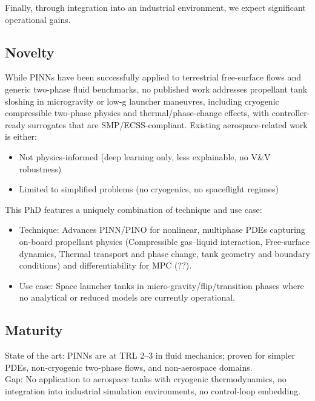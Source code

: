 \documentclass[12pt]{article}
\begin{document}
	Finally, through integration into an industrial environment, we expect significant operational gains.
	
	\subsection*{Novelty}
	
	While PINNs have been successfully applied to terrestrial free-surface flows and generic two-phase fluid benchmarks, no published work addresses propellant tank sloshing in microgravity or low-g launcher maneuvres, including cryogenic compressible two-phase physics and thermal/phase-change effects, with controller-ready surrogates that are SMP/ECSS-compliant.
	Existing aerospace-related work is either:
	
	\begin{itemize}
		\item Not physics-informed (deep learning only, less explainable, no V\&V robustness)
		\item Limited to simplified problems (no cryogenics, no spaceflight regimes)
	\end{itemize}
	
	This PhD features a uniquely combination of technique and use case:
	
	\begin{itemize}
		\item Technique: Advances PINN/PINO for nonlinear, multiphase PDEs capturing on-board propellant physics (Compressible gas–liquid interaction, Free-surface dynamics, Thermal transport and phase change, tank geometry and boundary conditions) and differentiability for MPC (??).
		
		\item Use case: Space launcher tanks in micro-gravity/flip/transition phases where no analytical or reduced models are currently operational.
	\end{itemize}
	
	\subsection*{Maturity}
	
	
	State of the art: PINNs are at TRL 2–3 in fluid mechanics; proven for simpler PDEs, non-cryogenic two-phase flows, and non-aerospace domains.
	\\
	
	Gap: No application to aerospace tanks with cryogenic thermodynamics, no integration into industrial simulation environments, no control-loop embedding.
	\\
		
\end{document}

